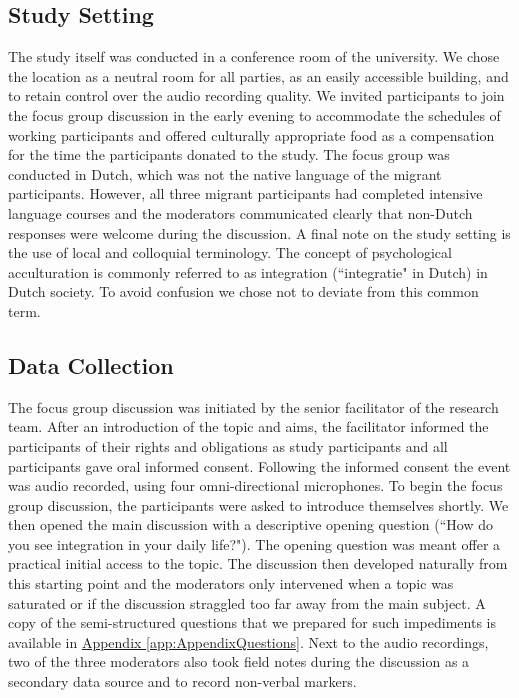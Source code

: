 \documentclass[man, 12pt, a4paper]{apa7}
\begin{document}
\subsection{Study Setting}

The study itself was conducted in a conference room of the university. We chose the location as a neutral room for all parties, as an easily accessible building, and to retain control over the audio recording quality. We invited participants to join the focus group discussion in the early evening to accommodate the schedules of working participants and offered culturally appropriate food as a compensation for the time the participants donated to the study. The focus group was conducted in Dutch, which was not the native language of the migrant participants. However, all three migrant participants had completed intensive language courses and the moderators communicated clearly that non-Dutch responses were welcome during the discussion. A final note on the study setting is the use of local and colloquial terminology. The concept of psychological acculturation is commonly referred to as integration (``integratie" in Dutch) in Dutch society. To avoid confusion we chose not to deviate from this common term. 

\subsection{Data Collection}

The focus group discussion was initiated by the senior facilitator of the research team. After an introduction of the topic and aims, the facilitator informed the participants of their rights and obligations as study participants and all participants gave oral informed consent. Following the informed consent the event was audio recorded, using four omni-directional microphones. To begin the focus group discussion, the participants were asked to introduce themselves shortly. We then opened the main discussion with a descriptive opening question (``How do you see integration in your daily life?"). The opening question was meant offer a practical initial access to the topic. The discussion then developed naturally from this starting point and the moderators only intervened when a topic was saturated or if the discussion straggled too far away from the main subject. A copy of the semi-structured questions that we prepared for such impediments is available in \hyperref[app:AppendixQuestions]{Appendix \ref*{app:AppendixQuestions}}. Next to the audio recordings, two of the three moderators also took field notes during the discussion as a secondary data source and to record non-verbal markers.
\end{document}
